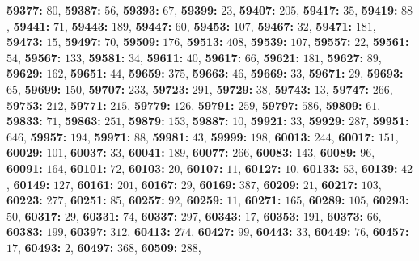 \textsf{\bfseries 59377:} $80$, \textsf{\bfseries 59387:} $56$, \textsf{\bfseries 59393:} $67$, \textsf{\bfseries 59399:} $23$, \textsf{\bfseries 59407:} $205$, \textsf{\bfseries 59417:} $35$, \textsf{\bfseries 59419:} $88$, \textsf{\bfseries 59441:} $71$, \textsf{\bfseries 59443:} $189$, \textsf{\bfseries 59447:} $60$, \textsf{\bfseries 59453:} $107$, \textsf{\bfseries 59467:} $32$, \textsf{\bfseries 59471:} $181$, \textsf{\bfseries 59473:} $15$, \textsf{\bfseries 59497:} $70$, \textsf{\bfseries 59509:} $176$, \textsf{\bfseries 59513:} $408$, \textsf{\bfseries 59539:} $107$, \textsf{\bfseries 59557:} $22$, \textsf{\bfseries 59561:} $54$, \textsf{\bfseries 59567:} $133$, \textsf{\bfseries 59581:} $34$, \textsf{\bfseries 59611:} $40$, \textsf{\bfseries 59617:} $66$, \textsf{\bfseries 59621:} $181$, \textsf{\bfseries 59627:} $89$, \textsf{\bfseries 59629:} $162$, \textsf{\bfseries 59651:} $44$, \textsf{\bfseries 59659:} $375$, \textsf{\bfseries 59663:} $46$, \textsf{\bfseries 59669:} $33$, \textsf{\bfseries 59671:} $29$, \textsf{\bfseries 59693:} $65$, \textsf{\bfseries 59699:} $150$, \textsf{\bfseries 59707:} $233$, \textsf{\bfseries 59723:} $291$, \textsf{\bfseries 59729:} $38$, \textsf{\bfseries 59743:} $13$, \textsf{\bfseries 59747:} $266$, \textsf{\bfseries 59753:} $212$, \textsf{\bfseries 59771:} $215$, \textsf{\bfseries 59779:} $126$, \textsf{\bfseries 59791:} $259$, \textsf{\bfseries 59797:} $586$, \textsf{\bfseries 59809:} $61$, \textsf{\bfseries 59833:} $71$, \textsf{\bfseries 59863:} $251$, \textsf{\bfseries 59879:} $153$, \textsf{\bfseries 59887:} $10$, \textsf{\bfseries 59921:} $33$, \textsf{\bfseries 59929:} $287$, \textsf{\bfseries 59951:} $646$, \textsf{\bfseries 59957:} $194$, \textsf{\bfseries 59971:} $88$, \textsf{\bfseries 59981:} $43$, \textsf{\bfseries 59999:} $198$, \textsf{\bfseries 60013:} $244$, \textsf{\bfseries 60017:} $151$, \textsf{\bfseries 60029:} $101$, \textsf{\bfseries 60037:} $33$, \textsf{\bfseries 60041:} $189$, \textsf{\bfseries 60077:} $266$, \textsf{\bfseries 60083:} $143$, \textsf{\bfseries 60089:} $96$, \textsf{\bfseries 60091:} $164$, \textsf{\bfseries 60101:} $72$, \textsf{\bfseries 60103:} $20$, \textsf{\bfseries 60107:} $11$, \textsf{\bfseries 60127:} $10$, \textsf{\bfseries 60133:} $53$, \textsf{\bfseries 60139:} $42$, \textsf{\bfseries 60149:} $127$, \textsf{\bfseries 60161:} $201$, \textsf{\bfseries 60167:} $29$, \textsf{\bfseries 60169:} $387$, \textsf{\bfseries 60209:} $21$, \textsf{\bfseries 60217:} $103$, \textsf{\bfseries 60223:} $277$, \textsf{\bfseries 60251:} $85$, \textsf{\bfseries 60257:} $92$, \textsf{\bfseries 60259:} $11$, \textsf{\bfseries 60271:} $165$, \textsf{\bfseries 60289:} $105$, \textsf{\bfseries 60293:} $50$, \textsf{\bfseries 60317:} $29$, \textsf{\bfseries 60331:} $74$, \textsf{\bfseries 60337:} $297$, \textsf{\bfseries 60343:} $17$, \textsf{\bfseries 60353:} $191$, \textsf{\bfseries 60373:} $66$, \textsf{\bfseries 60383:} $199$, \textsf{\bfseries 60397:} $312$, \textsf{\bfseries 60413:} $274$, \textsf{\bfseries 60427:} $99$, \textsf{\bfseries 60443:} $33$, \textsf{\bfseries 60449:} $76$, \textsf{\bfseries 60457:} $17$, \textsf{\bfseries 60493:} $2$, \textsf{\bfseries 60497:} $368$, \textsf{\bfseries 60509:} $288$, 
